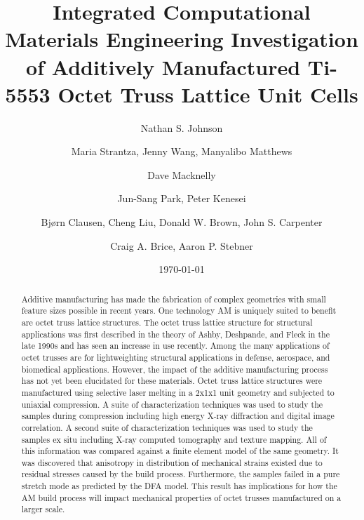 \documentclass[aps,twocolumn,nofootinbib]{revtex4-1}
\begin{document}
\title{Integrated Computational Materials Engineering Investigation of Additively Manufactured Ti-5553 Octet Truss Lattice Unit Cells}
\author{Nathan S. Johnson}

\author{Maria Strantza, Jenny Wang, Manyalibo Matthews}

\author{Dave Macknelly}

\author{Jun-Sang Park, Peter Kenesei}

\author{Bj\o rn Clausen, Cheng Liu, Donald W. Brown, John S. Carpenter}

\author{Craig A. Brice, Aaron P. Stebner}

\begin{abstract}
Additive manufacturing has made the fabrication of complex geometries with small feature sizes possible in recent years. One technology AM is uniquely suited to benefit are octet truss lattice structures. The octet truss lattice structure for structural applications was first described in the theory of Ashby, Deshpande, and Fleck in the late 1990s and has seen an increase in use recently. Among the many applications of octet trusses are for lightweighting structural applications in defense, aerospace, and biomedical applications. However, the impact of the additive manufacturing process has not yet been elucidated for these materials. Octet truss lattice structures were manufactured using selective laser melting in a 2x1x1 unit geometry and subjected to uniaxial compression. A suite of characterization techniques was used to study the samples during compression including high energy X-ray diffraction and digital image correlation. A second suite of characterization techniques was used to study the samples ex situ including X-ray computed tomography and texture mapping. All of this information was compared against a finite element model of the same geometry. It was discovered that anisotropy in distribution of mechanical strains existed due to residual stresses caused by the build process. Furthermore, the samples failed in a pure stretch mode as predicted by the DFA model. This result has implications for how the AM build process will impact mechanical properties of octet trusses manufactured on a larger scale.
\end{abstract}
\date{\today}
\maketitle








\end{document}
